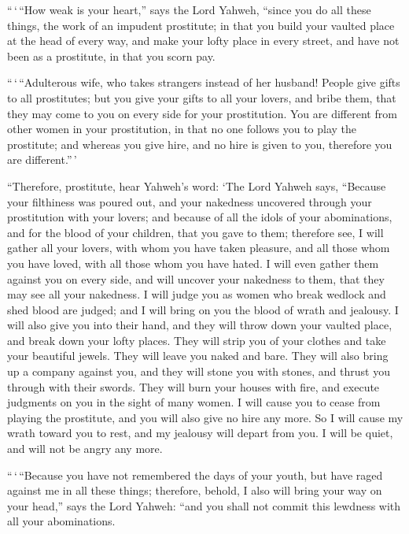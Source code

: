  ``\,`\,``How weak is your heart,'' says the Lord Yahweh,
``since you do all these things, the work of an impudent prostitute;
 in that you build your vaulted place at the head of
every way, and make your lofty place in every street, and have not been
as a prostitute, in that you scorn pay.

 ``\,`\,``Adulterous wife, who takes strangers instead of
her husband!  People give gifts to all prostitutes; but
you give your gifts to all your lovers, and bribe them, that they may
come to you on every side for your prostitution.  You are
different from other women in your prostitution, in that no one follows
you to play the prostitute; and whereas you give hire, and no hire is
given to you, therefore you are different.''\,'

 ``Therefore, prostitute, hear Yahweh's word:
 `The Lord Yahweh says, ``Because your filthiness was
poured out, and your nakedness uncovered through your prostitution with
your lovers; and because of all the idols of your abominations, and for
the blood of your children, that you gave to them; 
therefore see, I will gather all your lovers, with whom you have taken
pleasure, and all those whom you have loved, with all those whom you
have hated. I will even gather them against you on every side, and will
uncover your nakedness to them, that they may see all your nakedness.
 I will judge you as women who break wedlock and shed
blood are judged; and I will bring on you the blood of wrath and
jealousy.  I will also give you into their hand, and they
will throw down your vaulted place, and break down your lofty places.
They will strip you of your clothes and take your beautiful jewels. They
will leave you naked and bare.  They will also bring up a
company against you, and they will stone you with stones, and thrust you
through with their swords.  They will burn your houses
with fire, and execute judgments on you in the sight of many women. I
will cause you to cease from playing the prostitute, and you will also
give no hire any more.  So I will cause my wrath toward
you to rest, and my jealousy will depart from you. I will be quiet, and
will not be angry any more.

 ``\,`\,``Because you have not remembered the days of
your youth, but have raged against me in all these things; therefore,
behold, I also will bring your way on your head,'' says the Lord Yahweh:
``and you shall not commit this lewdness with all your abominations.

